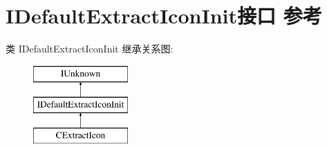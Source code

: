 \hypertarget{interface_i_default_extract_icon_init}{}\section{I\+Default\+Extract\+Icon\+Init接口 参考}
\label{interface_i_default_extract_icon_init}
类 I\+Default\+Extract\+Icon\+Init 继承关系图\+:\begin{figure}[H]
\begin{center}
\leavevmode
\includegraphics[height=3.000000cm]{interface_i_default_extract_icon_init}
\end{center}
\end{figure}
